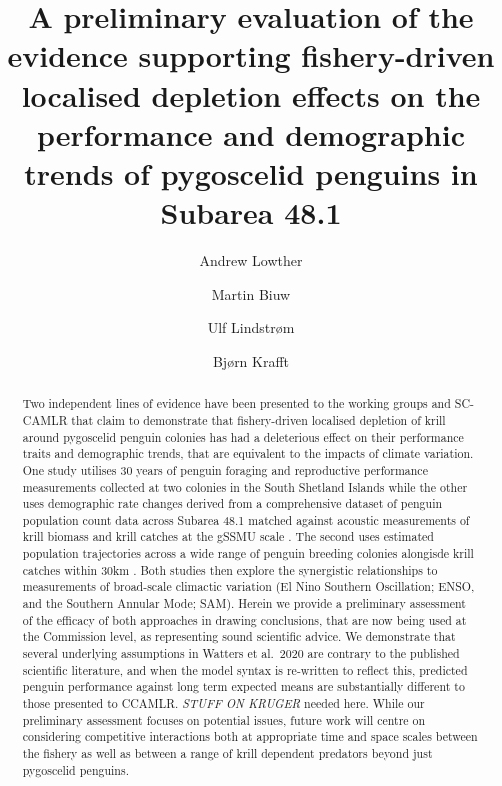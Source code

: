 \documentclass[]{elsarticle} %
\begin{document}
\begin{frontmatter}

  \title{A preliminary evaluation of the evidence supporting
fishery-driven localised depletion effects on the performance and
demographic trends of pygoscelid penguins in Subarea 48.1}
    \author[Norwegian Polar Institute, Tromsø, Norway]{Andrew Lowther%
  }
    \author[Institute of Marine Research, Tromsø, Norway]{Martin Biuw%
  }
    \author[Institute of Marine Research, Tromsø, Norway]{Ulf Lindstrøm%
  }
    \author[Institute of Marine Research, Bergen, Norway]{Bjørn Krafft%
  }
  
  \begin{abstract}
  Two independent lines of evidence have been presented to the working
  groups and SC-CAMLR that claim to demonstrate that fishery-driven
  localised depletion of krill around pygoscelid penguin colonies has
  had a deleterious effect on their performance traits and demographic
  trends, that are equivalent to the impacts of climate variation. One
  study utilises 30 years of penguin foraging and reproductive
  performance measurements collected at two colonies in the South
  Shetland Islands while the other uses demographic rate changes derived
  from a comprehensive dataset of penguin population count data across
  Subarea 48.1 matched against acoustic measurements of krill biomass
  and krill catches at the gSSMU scale \citep{Watters2020}. The second
  uses estimated population trajectories across a wide range of penguin
  breeding colonies alongisde krill catches within 30km
  \citep{Kruger2021}. Both studies then explore the synergistic
  relationships to measurements of broad-scale climactic variation (El
  Nino Southern Oscillation; ENSO, and the Southern Annular Mode; SAM).
  Herein we provide a preliminary assessment of the efficacy of both
  approaches in drawing conclusions, that are now being used at the
  Commission level, as representing sound scientific advice. We
  demonstrate that several underlying assumptions in Watters et al.~2020
  are contrary to the published scientific literature, and when the
  model syntax is re-written to reflect this, predicted penguin
  performance against long term expected means are substantially
  different to those presented to CCAMLR. \emph{STUFF ON KRUGER} needed
  here. While our preliminary assessment focuses on potential issues,
  future work will centre on considering competitive interactions both
  at appropriate time and space scales between the fishery as well as
  between a range of krill dependent predators beyond just pygoscelid
  penguins.
  \end{abstract}
  
 \end{frontmatter}
\end{document}
